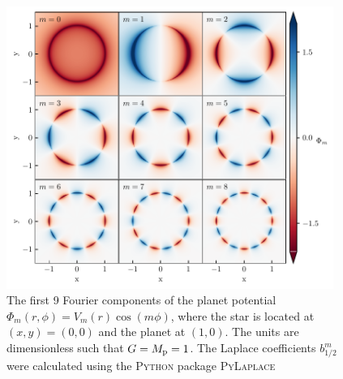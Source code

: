 \begin{figure}
    \centering
    \includegraphics[width = 0.95\textwidth]{figures/planet_components.pdf}
    \caption{The first 9 Fourier components of the planet potential $\Phi_m(r,\phi) = V_m(r) \cos (m \phi)$, where the star is located at $(x,y) = (0,0)$ and the planet at $(1,0)$. The units are dimensionless such that $G=M_{\rm p}=1$. The Laplace coefficients $b_{1/2}^m$ were calculated using the \textsc{Python} package \textsc{PyLaplace}\protect\footnotemark}
    \label{fig:planet_fourier}
\end{figure}


